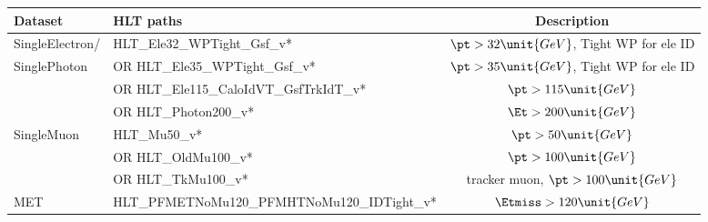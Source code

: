 \scriptsize
\begin{tabular}{l|l|c}
  \hline
  Dataset        & HLT paths                                    & Description\\
  \hline \hline
  \ttfamily SingleElectron/& \ttfamily HLT\_Ele32\_WPTight\_Gsf\_v*                 & $\pt>32\unit{GeV}$, Tight WP for ele ID  \\
  \ttfamily SinglePhoton   & \ttfamily OR HLT\_Ele35\_WPTight\_Gsf\_v*              & $\pt>35\unit{GeV}$, Tight WP for ele ID  \\
                 & \ttfamily OR HLT\_Ele115\_CaloIdVT\_GsfTrkIdT\_v*      & $\pt>115\unit{GeV}$  \\
                 & \ttfamily OR HLT\_Photon200\_v*                        & $\Et>200\unit{GeV}$  \\
  \hline
  \ttfamily SingleMuon     & \ttfamily HLT\_Mu50\_v*                                & $\pt>50\unit{GeV}$ \\
                 & \ttfamily OR HLT\_OldMu100\_v*                         & $\pt>100\unit{GeV}$ \\
                 & \ttfamily OR HLT\_TkMu100\_v*                          & tracker muon, $\pt>100\unit{GeV}$ \\
  \hline
  \ttfamily MET            & \ttfamily HLT\_PFMETNoMu120\_PFMHTNoMu120\_IDTight\_v* & $\Etmiss>120\unit{GeV}$ \\
  \hline
\end{tabular}
